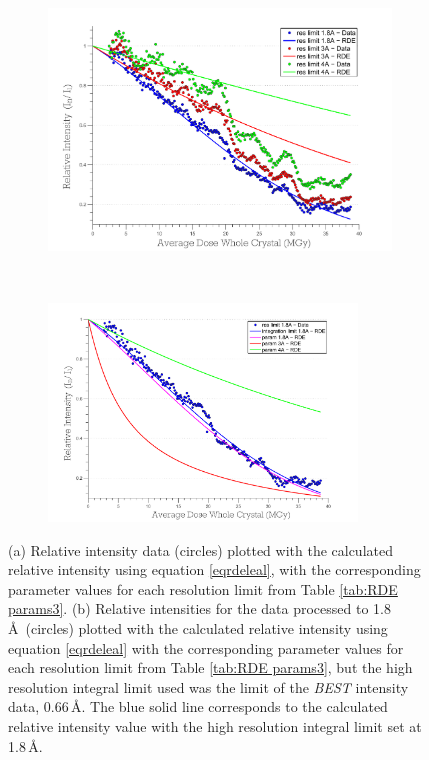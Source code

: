 \begin{figure}
    \centering
    \begin{subfigure}[b]{0.9\textwidth}
        \centering
        \includegraphics[width=\textwidth]{figures/dwd/rescmpplot1.pdf}
        \caption{}
        \label{fig:Resolution comparison plot - scaled to diff res}
    \end{subfigure}
			\\
    \begin{subfigure}[b]{1\textwidth}
        \centering
        \includegraphics[width=0.9\textwidth]{figures/dwd/rescmpplot3.pdf}
        \caption{}
        \label{fig:Resolution comparison plot - integrated to diff res}
    \end{subfigure}
	\caption[Effects of resolution cut offs on Leal \textit{et al.} model.]{(a) Relative intensity data (circles) plotted with the calculated relative intensity using equation \ref{eqrdeleal}, with the corresponding parameter values for each resolution limit from Table \ref{tab:RDE params3}.
	(b) Relative intensities for the data processed to 1.8\,\AA\ (circles) plotted with the calculated relative intensity using equation \ref{eqrdeleal} with the corresponding parameter values for each resolution limit from Table \ref{tab:RDE params3}, but the high resolution integral limit used was the limit of the \emph{BEST} intensity data, 0.66$\,$\AA.
	The blue solid line corresponds to the calculated relative intensity value with the high resolution integral limit set at 1.8$\,$\AA.}
	\label{figrescont1}
\end{figure}
